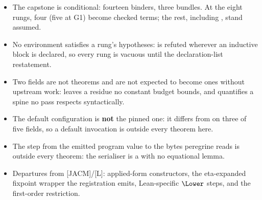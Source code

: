 \begin{itemize}
\item The capstone is conditional: fourteen binders, three bundles. At the eight rungs, four
(five at G1) become checked terms; the rest, including , stand assumed.
\item No environment satisfies a rung's hypotheses:  is refuted wherever an
inductive block is declared, so every rung is vacuous until the declaration-list restatement.
\item Two  fields are not theorems and are not expected to become ones without
upstream work:  leaves a residue no constant budget bounds, and
 quantifies a spine no pass respects syntactically.
\item The default  configuration is \textbf{not} the pinned one: it differs from
 on three of five fields, so a default invocation is outside every theorem here.
\item The step from the emitted program value to the  bytes peregrine reads is outside
every theorem: the serialiser is a  with no equational lemma.
\item Departures from [JACM]/[L]: applied-form constructors, the eta-expanded fixpoint wrapper the
registration emits, Lean-specific $\Lower$ steps, and the first-order restriction.
\end{itemize}
